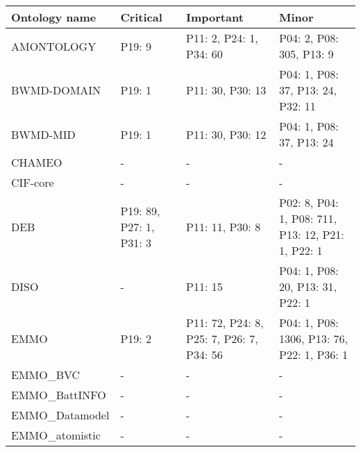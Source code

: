 \begin{tabular}{m{4cm}m{3cm}m{3cm}m{5cm}}
\toprule
          Ontology name &                Critical &                                                Important &                                             Minor \\
\midrule
             AMONTOLOGY &                  P19: 9 &                                  P11: 2, P24: 1, P34: 60 &                          P04: 2, P08: 305, P13: 9 \\
            BWMD-DOMAIN &                  P19: 1 &                                         P11: 30, P30: 13 &                 P04: 1, P08: 37, P13: 24, P32: 11 \\
               BWMD-MID &                  P19: 1 &                                         P11: 30, P30: 12 &                          P04: 1, P08: 37, P13: 24 \\
                 CHAMEO &                       - &                                                        - &                                                 - \\
               CIF-core &                       - &                                                        - &                                                 - \\
                    DEB & P19: 89, P27: 1, P31: 3 &                                          P11: 11, P30: 8 & P02: 8, P04: 1, P08: 711, P13: 12, P21: 1, P22: 1 \\
                   DISO &                       - &                                                  P11: 15 &                  P04: 1, P08: 20, P13: 31, P22: 1 \\
                   EMMO &                  P19: 2 &                 P11: 72, P24: 8, P25: 7, P26: 7, P34: 56 &        P04: 1, P08: 1306, P13: 76, P22: 1, P36: 1 \\
               EMMO_BVC &                       - &                                                        - &                                                 - \\
          EMMO_BattINFO &                       - &                                                        - &                                                 - \\
         EMMO_Datamodel &                       - &                                                        - &                                                 - \\
         EMMO_atomistic &                       - &                                                        - &                                                 - \\

\end{tabular}
